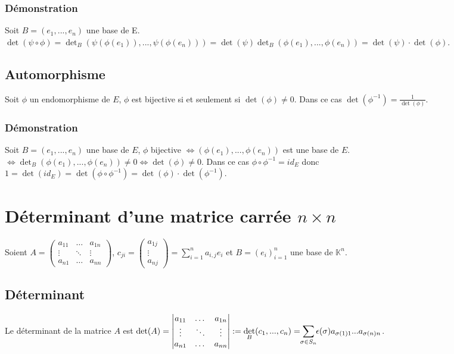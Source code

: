 \documentclass[a4paper,10pt]{book} %
\newcommand{\K}{\mathbb{K}}
\newcommand{\displayAmath}{\displaystyle}
\begin{document}
\subsubsection{Démonstration}
Soit $B=(e_1,...,e_n)$ une base de E.\\ $\det(\psi\circ\phi)=\det_B(\psi(\phi(e_1)),...,\psi(\phi(e_n)))=\det(\psi)\det_B(\phi(e_1),...,\phi(e_n))=\det(\psi)\cdot \det(\phi)$.

\vfill

\subsection{Automorphisme}
Soit $\phi$ un endomorphisme de $E$, $\phi$ est bijective si et seulement si $\det(\phi)\neq 0$.
Dans ce cas $\det(\phi^{-1})=\frac{1}{\det(\phi)}$.

\subsubsection{Démonstration}
Soit $B=(e_1,...,e_n)$ une base de $E$, $\phi$ bijective $\Leftrightarrow(\phi(e_1),...,\phi(e_n))$ est une base de $E$.
$\Leftrightarrow \det_B(\phi(e_1),...,\phi(e_n))\neq 0
\Leftrightarrow \det(\phi)\neq 0$.
Dans ce cas $\phi\circ\phi^{-1}=id_E$ donc $1=\det(id_E)=\det(\phi\circ\phi^{-1})=\det(\phi)\cdot \det(\phi^{-1})$.

\vfill

\newpage

\section{Déterminant d'une matrice carrée $n\times n$}
Soient $A=\begin{pmatrix}
a_{11}&\dots&a_{1n}\\
\vdots&\ddots&\vdots \\
a_{n1}&\dots&a_{nn}
\end{pmatrix}$, $\displayAmath c_{ji}=\begin{pmatrix}
a_{1j}\\\vdots\\a_{nj}
\end{pmatrix}=\sum_{i=1}^na_{i,j}e_i$ et $B=(e_i)_{i=1}^n$ une base de $\K^n$.

\subsection{Déterminant}
Le déterminant de la matrice $A$ est $\displayAmath\det(A)=\begin{vmatrix}
a_{11} & \dots&a_{1n}\\
\vdots&\ddots&\vdots \\
a_{n1}&\dots&a_{nn}
\end{vmatrix}:=\det_B(c_1,...,c_n)=\sum_{\mathclap{\sigma\in S_n}}\epsilon(\sigma)a_{\sigma(1)1}...a_{\sigma(n)n}$.
\end{document}
